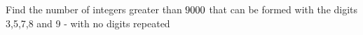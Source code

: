 
%
%
%
%      
% 
% 
%   



\question[1] Find the number of integers greater than $9000$ that can be formed with the digits 3,5,7,8 and 9 - with
 no digits repeated

